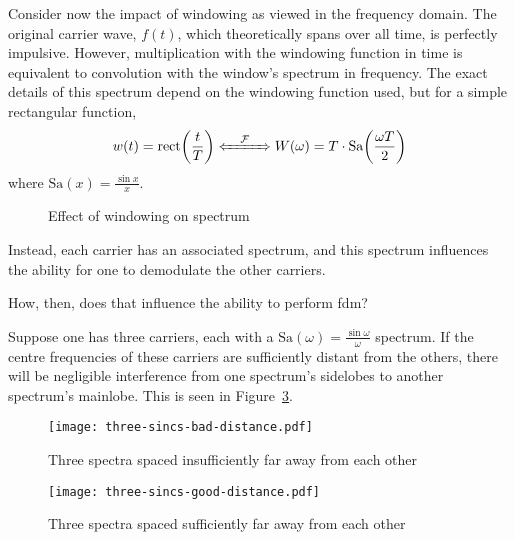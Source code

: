 \documentclass[class=report,11pt,crop=false]{standalone}
\begin{document}
Consider now the impact of windowing as viewed in the frequency domain. The original carrier wave, \(f(t)\), which theoretically spans over all time, is perfectly impulsive. However, multiplication with the windowing function in time is equivalent to convolution with the window's spectrum in frequency. The exact details of this spectrum depend on the windowing function used, but for a simple rectangular function,
\begin{equation}
    w(t) = \textrm{rect}\bigg(\frac{t}{T}\bigg) \xLeftrightarrow{\quad\mathcal{F}\quad} W(\omega) = T \cdot \textrm{Sa}\bigg(\frac{\omega T}{2}\bigg)
\end{equation}
where \(\textrm{Sa}(x)=\frac{\sin{x}}{x}\).

\begin{figure}[htbp]
    \centering
    \captionsetup{type=figure}
    \def\svgwidth{\linewidth}
    { %
        }
    \caption{Effect of windowing on spectrum}
    \label{fig:sampling-sine-freq}
\end{figure}

Instead, each carrier has an associated spectrum, and this spectrum influences the ability for one to demodulate the other carriers.

How, then, does that influence the ability to perform \gls{fdm}?

Suppose one has three carriers, each with a \(\textrm{Sa}(\omega) = \frac{\sin \omega}{\omega}\) spectrum. If the centre frequencies of these carriers are sufficiently distant from the others, there will be negligible interference from one spectrum's sidelobes to another spectrum's mainlobe. This is seen in Figure~\ref{fig:three-sincs-good-distance}.


\begin{figure}
    \centering
    \captionsetup{type=figure}
    \texttt{[image: three-sincs-bad-distance.pdf]}
    \caption{Three spectra spaced insufficiently far away from each other}
    \label{fig:three-sincs-bad-distance}
\end{figure}

\begin{figure}[htbp]
    \centering
    \captionsetup{type=figure}
    \texttt{[image: three-sincs-good-distance.pdf]}
    \caption{Three spectra spaced sufficiently far away from each other}
    \label{fig:three-sincs-good-distance}
\end{figure}
\end{document}

